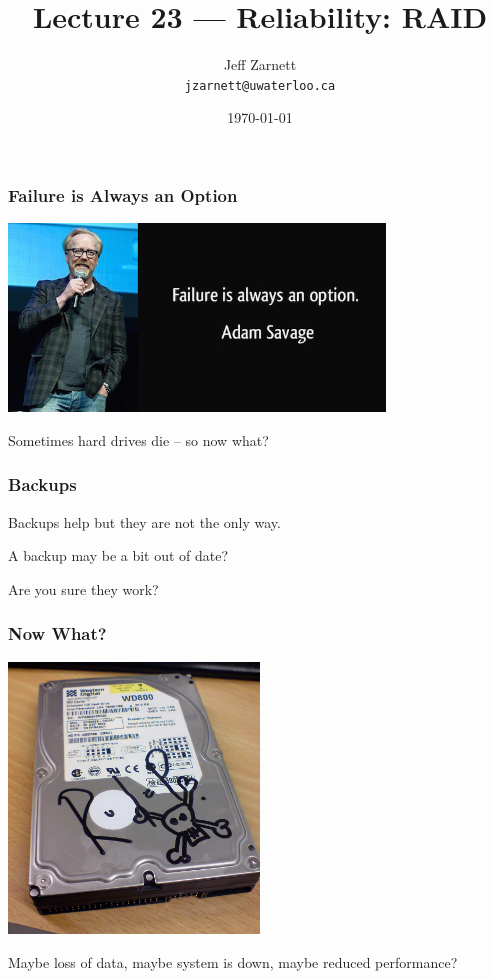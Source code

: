 

\title{Lecture 23 --- Reliability: RAID }

\author{Jeff Zarnett \\ \small \texttt{jzarnett@uwaterloo.ca}}
\date{\today}




\begin{frame}
  \titlepage

 \end{frame}


\begin{frame}
\frametitle{Failure is Always an Option}

\begin{center}
	\includegraphics[width=0.75\textwidth]{images/failure.jpg}
\end{center}

Sometimes hard drives die -- so now what?

\end{frame}


\begin{frame}
\frametitle{Backups}

Backups help but they are not the only way.

A backup may be a bit out of date?

Are you sure they work?

\end{frame}


\begin{frame}
\frametitle{Now What?}

\begin{center}
	\includegraphics[width=0.5\textwidth]{images/rip-hdd.jpg}
\end{center}

Maybe loss of data, maybe system is down, maybe reduced performance?

\end{frame}


